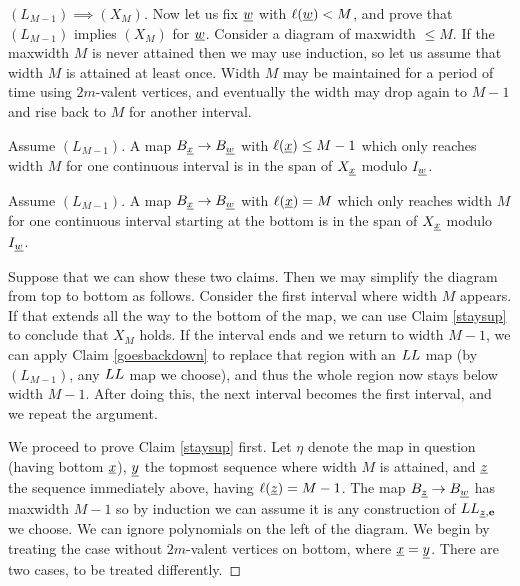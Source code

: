 \begin{proof}[$(L_{M-1}) \implies (X_M)$] Now let us fix ${\underline{w}}$ with $\ell({\underline{w}})<M$, and prove that $(L_{M-1})$ implies $(X_M)$ for ${\underline{w}}$. Consider a diagram of maxwidth $\le M$. If the
maxwidth $M$ is never attained then we may use induction, so let us assume that width $M$ is attained at least once. Width $M$ may be maintained for a period of time using $2m$-valent
vertices, and eventually the width may drop again to $M-1$ and rise back to $M$ for another interval.

\begin{claim} \label{goesbackdown} Assume $(L_{M-1})$. A map $B_{\underline{x}} \rightarrow B_{\underline{w}}$ with $\ell({\underline{x}}) \le M-1$ which only reaches width $M$ for one continuous interval is in the span of $X_{\underline{x}}$ modulo $I_{\underline{w}}$.
\end{claim}

\begin{claim} \label{staysup} Assume $(L_{M-1})$. A map $B_{\underline{x}} \rightarrow B_{\underline{w}}$ with $\ell({\underline{x}}) = M$ which only reaches width $M$ for one continuous interval starting at the
bottom is in the span of $X_{\underline{x}}$ modulo $I_{\underline{w}}$. \end{claim}

Suppose that we can show these two claims. Then we may simplify the diagram from top to bottom as follows. Consider the first interval where width $M$ appears. If that extends all the way
to the bottom of the map, we can use Claim \ref{staysup} to conclude that $X_M$ holds. If the interval ends and we return to width $M-1$, we can apply Claim \ref{goesbackdown} to replace that region with
an $LL$ map (by $(L_{M-1})$, any $LL$ map we choose), and thus the whole region now stays below width $M-1$. After doing this, the next interval becomes the first interval, and we repeat
the argument.

We proceed to prove Claim \ref{staysup} first. Let $\eta$ denote the map in question (having bottom ${\underline{x}}$), ${\underline{y}}$ the topmost sequence where width $M$ is attained, and $\underline{z}$
the sequence immediately above, having $\ell(\underline{z})=M-1$. The map $B_{\underline{z}} \rightarrow B_{\underline{w}}$ has maxwidth $M-1$ so by induction we can assume it is any construction of
$LL_{{\underline{z}},{\mathbf e}}$ we choose. We can ignore polynomials on the left of the diagram. We begin by treating the case without $2m$-valent vertices on bottom, where ${\underline{x}}={\underline{y}}$. There
are two cases, to be treated differently.



\end{proof}

